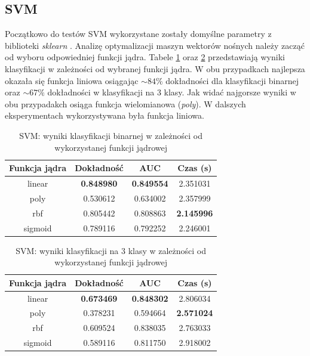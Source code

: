 \documentclass[a4paper, twoside, 11pt, openright]{article}
\begin{document}
\subsection{SVM}

Początkowo do testów SVM wykorzystane zostały domyślne parametry z biblioteki \textit{sklearn} \cite{bib:sklearnsvm}. Analizę optymalizacji maszyn wektorów nośnych należy zacząć od wyboru odpowiedniej funkcji jądra. Tabele \ref{tab:svm_kernel_binary} oraz \ref{tab:svm_kernel_discrete} przedstawiają wyniki klasyfikacji w zależności od wybranej funkcji jądra. W obu przypadkach najlepsza okazała się funkcja liniowa osiągając $\sim 84\%$ dokładności dla klasyfikacji binarnej oraz $\sim 67\%$  dokładności w klasyfikacji na 3 klasy. Jak widać najgorsze wyniki w obu przypadakch osiąga funkcja wielomianowa (\textit{poly}).  W dalszych eksperymentach wykorzystywana była funkcja liniowa.

\begin{table}[H]
    \centering
    \begin{tabular}{|c|c|c|c|}
    \hline
        \textbf{Funkcja jądra} & \textbf{Dokładność} & \textbf{AUC} & \textbf{Czas (s)} \\ \hline
linear  &  \textbf{0.848980} &  \textbf{0.849554} &    2.351031 \\ \hline
poly    &  0.530612 &  0.634002 &    2.357999 \\ \hline
rbf     &  0.805442 &  0.808863 &    \textbf{2.145996} \\ \hline
sigmoid &  0.789116 &  0.792252 &    2.246001 \\ \hline
    \end{tabular}
    \caption{SVM: wyniki klasyfikacji binarnej w zależności od wykorzystanej funkcji jądrowej}
    \label{tab:svm_kernel_binary}
\end{table}

\begin{table}[H]
    \centering
    \begin{tabular}{|c|c|c|c|}
    \hline
        \textbf{Funkcja jądra} & \textbf{Dokładność} & \textbf{AUC} & \textbf{Czas (s)} \\ \hline
linear  &  \textbf{0.673469} &  \textbf{0.848302} &    2.806034 \\ \hline
poly    &  0.378231 &  0.594664 &    \textbf{2.571024} \\ \hline
rbf     &  0.609524 &  0.838035 &    2.763033 \\ \hline
sigmoid &  0.589116 &  0.811750 &    2.918002 \\ \hline
    \end{tabular}
    \caption{SVM: wyniki klasyfikacji na 3 klasy w zależności od wykorzystanej funkcji jądrowej}
    \label{tab:svm_kernel_discrete}
\end{table}
\end{document}
